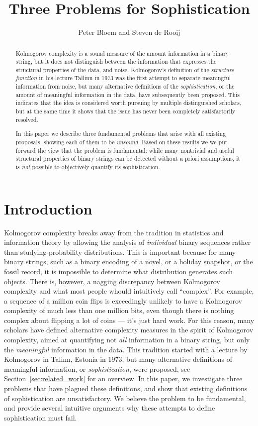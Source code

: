 \documentclass{style/llncs}
\title{Three Problems for Sophistication}
\author{Peter Bloem and Steven de Rooij}
\institute{
  System and Network Engineering Group, \\University of Amsterdam, the Netherlands\\
  \email{uva@peterbloem.nl, steven.de.rooij@gmail.com}
}
\begin{document}
\maketitle

\begin{abstract}
Kolmogorov complexity is a sound measure of the amount information in a binary string, but it does not distinguish between the information that expresses the structural properties of the data, and noise. Kolmogorov's definition of the \emph{structure function} in his lecture Tallinn in 1973 was the first attempt to separate meaningful information from noise, but many alternative definitions of the \emph{sophistication}, or the amount of meaningful information in the data, have subsequently been proposed. This indicates that the idea is considered worth pursuing by multiple distinguished scholars, but at the same time it shows that the issue has never been completely satisfactorily resolved.

In this paper we describe three fundamental problems that arise with all existing proposals, showing each of them to be \emph{unsound}. Based on these results we we put forward the view that the problem is fundamental: while many nontrivial and useful structural properties of binary strings can be detected without a priori assumptions, it is \emph{not} possible to objectively quantify its sophistication.
\end{abstract}

\section{Introduction}

Kolmogorov complexity breaks away from the tradition in statistics and information theory by allowing the analysis of \emph{individual} binary sequences rather than studying probability distributions. This is important because for many binary strings, such as a binary encoding of a novel, or a holiday snapshot, or the fossil record, it is impossible to determine what distribution generates such objects. There is, however, a nagging discrepancy between Kolmogorov complexity and what most people whould intuitively call ``complex''. For example, a sequence of a million coin flips is exceedingly unlikely to have a Kolmogorov complexity of much less than one million bits, even though there is nothing complex about flipping a lot of coins --- it's just hard work. For this reason, many scholars have defined alternative complexity measures in the spirit of Kolmogorov complexity, aimed at quantifying not \emph{all} information in a binary string, but only the \emph{meaningful} information in the data. This tradition started with a lecture by Kolmogorov in Talinn, Estonia in 1973, but many alternative definitions of meaningful information, or \emph{sophistication}, were proposed, see Section~\ref{sec:related_work} for an overview. In this paper, we investigate three problems that have plagued these definitions, and show that existing definitions of sophistication are unsatisfactory. We believe the problem to be fundamental, and provide several intuitive arguments why these attempts to define sophistication must fail.
\end{document}
